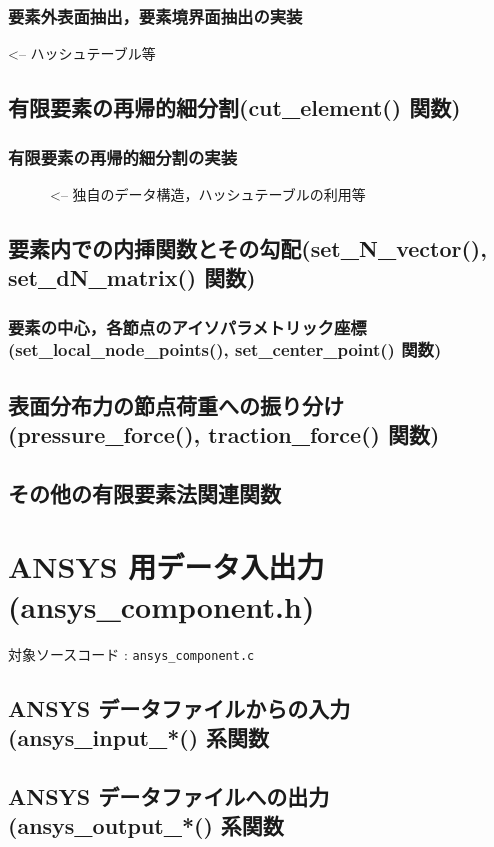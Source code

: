 \documentclass[a4paper,10pt]{jarticle}
\begin{document}
\subsubsection{要素外表面抽出，要素境界面抽出の実装}  <-- ハッシュテーブル等

\subsection{有限要素の再帰的細分割(cut\_element() 関数)}
\subsubsection{有限要素の再帰的細分割の実装}
　　　<-- 独自のデータ構造，ハッシュテーブルの利用等

\subsection{要素内での内挿関数とその勾配(set\_N\_vector(), set\_dN\_matrix() 関数)}
\subsubsection{要素の中心，各節点のアイソパラメトリック座標(set\_local\_node\_points(),
set\_center\_point() 関数)}

\subsection{表面分布力の節点荷重への振り分け(pressure\_force(), traction\_force() 関数)}

\subsection{その他の有限要素法関連関数}


\section{ANSYS 用データ入出力(ansys\_component.h)}
対象ソースコード : \verb|ansys_component.c|

\subsection{ANSYS データファイルからの入力(ansys\_input\_*() 系関数}

\subsection{ANSYS データファイルへの出力(ansys\_output\_*() 系関数}
\end{document}

